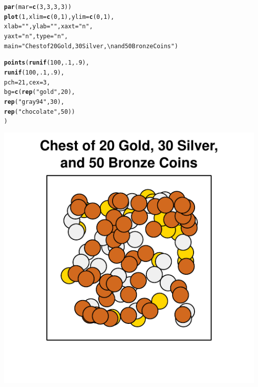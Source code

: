\documentclass{tufte-book}\usepackage[]{graphicx}\usepackage[]{color}
\makeatletter
\def\maxwidth{ %
  \ifdim\Gin@nat@width>\linewidth
    \linewidth
  \else
    \Gin@nat@width
  \fi
}
\newcommand{\hlnum}[1]{\textcolor[rgb]{0.686,0.059,0.569}{#1}}%
\newcommand{\hlstr}[1]{\textcolor[rgb]{0.192,0.494,0.8}{#1}}%
\newcommand{\hlstd}[1]{\textcolor[rgb]{0.345,0.345,0.345}{#1}}%
\newcommand{\hlkwc}[1]{\textcolor[rgb]{0.333,0.667,0.333}{#1}}%
\newcommand{\hlkwd}[1]{\textcolor[rgb]{0.737,0.353,0.396}{\textbf{#1}}}%
\newenvironment{kframe}{%
 \def\at@end@of@kframe{}%
 \ifinner\ifhmode%
  \def\at@end@of@kframe{\end{minipage}}%
  \begin{minipage}{\columnwidth}%
 \fi\fi%
 \def\FrameCommand##1{\hskip\@totalleftmargin \hskip-\fboxsep
 \colorbox{shadecolor}{##1}\hskip-\fboxsep
     \hskip-\linewidth \hskip-\@totalleftmargin \hskip\columnwidth}%
 \MakeFramed {\advance\hsize-\width
   \@totalleftmargin\z@ \linewidth\hsize
   \@setminipage}}%
 {\par\unskip\endMakeFramed%
 \at@end@of@kframe}
\newenvironment{knitrout}{}{} %
\makeatother
\begin{document}
\begin{marginfigure}
\begin{tiny}
\begin{knitrout}
\color{fgcolor}\begin{kframe}
\begin{alltt}
\hlkwd{par}\hlstd{(}\hlkwc{mar} \hlstd{=} \hlkwd{c}\hlstd{(}\hlnum{3}\hlstd{,} \hlnum{3}\hlstd{,} \hlnum{3}\hlstd{,} \hlnum{3}\hlstd{))}
\hlkwd{plot}\hlstd{(}\hlnum{1}\hlstd{,} \hlkwc{xlim} \hlstd{=} \hlkwd{c}\hlstd{(}\hlnum{0}\hlstd{,} \hlnum{1}\hlstd{),} \hlkwc{ylim} \hlstd{=} \hlkwd{c}\hlstd{(}\hlnum{0}\hlstd{,} \hlnum{1}\hlstd{),}
     \hlkwc{xlab} \hlstd{=} \hlstr{""}\hlstd{,} \hlkwc{ylab} \hlstd{=} \hlstr{""}\hlstd{,} \hlkwc{xaxt} \hlstd{=} \hlstr{"n"}\hlstd{,}
     \hlkwc{yaxt} \hlstd{=} \hlstr{"n"}\hlstd{,} \hlkwc{type} \hlstd{=} \hlstr{"n"}\hlstd{,}
     \hlkwc{main} \hlstd{=} \hlstr{"Chest of 20 Gold, 30 Silver,\textbackslash{}nand 50 Bronze Coins"}\hlstd{)}

\hlkwd{points}\hlstd{(}\hlkwd{runif}\hlstd{(}\hlnum{100}\hlstd{,} \hlnum{.1}\hlstd{,} \hlnum{.9}\hlstd{),}
       \hlkwd{runif}\hlstd{(}\hlnum{100}\hlstd{,} \hlnum{.1}\hlstd{,} \hlnum{.9}\hlstd{),}
       \hlkwc{pch} \hlstd{=} \hlnum{21}\hlstd{,} \hlkwc{cex} \hlstd{=} \hlnum{3}\hlstd{,}
       \hlkwc{bg} \hlstd{=} \hlkwd{c}\hlstd{(}\hlkwd{rep}\hlstd{(}\hlstr{"gold"}\hlstd{,} \hlnum{20}\hlstd{),}
              \hlkwd{rep}\hlstd{(}\hlstr{"gray94"}\hlstd{,} \hlnum{30}\hlstd{),}
              \hlkwd{rep}\hlstd{(}\hlstr{"chocolate"}\hlstd{,} \hlnum{50}\hlstd{))}
       \hlstd{)}
\end{alltt}
\end{kframe}
\includegraphics[width=\maxwidth]{figure/unnamed-chunk-42-1} 

\end{knitrout}
\end{tiny}
\end{marginfigure}
\end{document}
